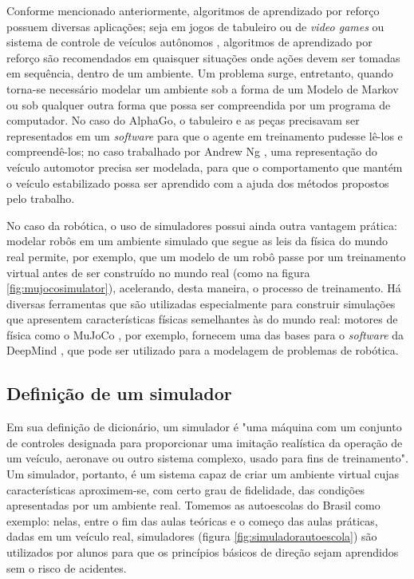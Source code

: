\documentclass[cic,tc]{iiufrgs}
\begin{document}
Conforme mencionado anteriormente, algoritmos de aprendizado por reforço
possuem diversas aplicações; seja em jogos de tabuleiro ou de
\textit{video games} \cite{AlphaGoEvolution2016,ALE,VizDoom} ou sistema de
controle de veículos autônomos \cite{Ng2003},
algoritmos de aprendizado por reforço são recomendados em quaisquer situações
onde ações devem ser tomadas em sequência, dentro de um ambiente. Um problema
surge, entretanto, quando torna-se necessário modelar um ambiente sob a forma de
um Modelo de Markov ou sob qualquer outra forma que possa ser compreendida por
um programa de computador. No caso do AlphaGo, o tabuleiro e as peças precisavam
ser representados em um \textit{software} para que o agente em treinamento
pudesse lê-los e compreendê-los; no caso trabalhado por Andrew Ng \cite{Ng2003},
uma representação do veículo automotor precisa ser modelada, para que o
comportamento que mantém o veículo estabilizado possa ser aprendido com a ajuda
dos métodos propostos pelo trabalho.


No caso da robótica, o uso de simuladores possui ainda outra vantagem prática:
modelar robôs em um ambiente simulado que segue as leis da física do mundo real
permite, por exemplo, que um modelo de um robô passe por um treinamento virtual
antes de ser construído no mundo real (como na figura \ref{fig:mujocosimulator}),
acelerando, desta maneira, o processo de treinamento. Há diversas ferramentas
que são utilizadas especialmente para construir simulações que apresentem
características físicas semelhantes às do mundo real: motores de física como o
MuJoCo \cite{MuJoCo}, por exemplo, fornecem uma das bases para o
\textit{software} da DeepMind \cite{DMControl}, que pode ser utilizado para a
modelagem de problemas de robótica.


\subsection{Definição de um simulador}
Em sua definição de dicionário, um simulador é "uma máquina com um conjunto de
controles designada para proporcionar uma imitação realística da operação de um
veículo, aeronave ou outro sistema complexo, usado para fins de treinamento". Um
simulador, portanto, é um sistema capaz de criar um ambiente virtual cujas
características aproximem-se, com certo grau de fidelidade, das condições
apresentadas por um ambiente real. Tomemos as autoescolas do Brasil como
exemplo: nelas, entre o fim das aulas teóricas e o começo das aulas práticas,
dadas em um veículo real, simuladores (figura \ref{fig:simuladorautoescola}) são
utilizados por alunos para que os princípios básicos de direção sejam aprendidos
sem o risco de acidentes.
\end{document}
